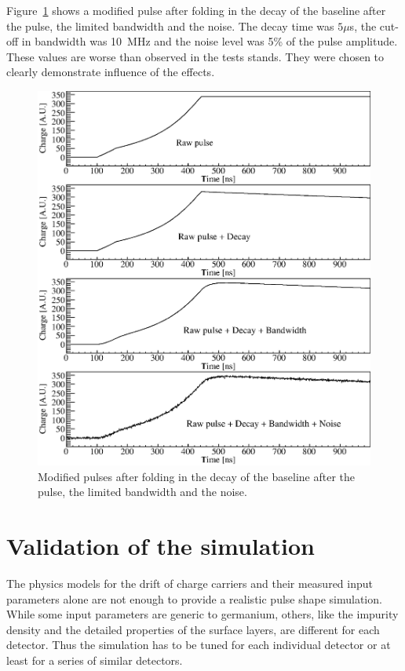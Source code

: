 \documentclass[epj]{svjour}
\begin{document}
Figure~\ref{f:elec} shows a modified pulse after folding in the decay
of the baseline after the pulse, the limited bandwidth and the
noise. The decay time was $5 \mu$s, the cut-off in bandwidth was
10~MHz and the noise level was 5\% of the pulse amplitude. These
values are worse than observed in the tests stands. They were chosen
to clearly demonstrate influence of the effects.
\begin{figure}
\includegraphics[width=\linewidth]{PSDBN} 
\caption{Modified pulses after folding in the decay of the baseline
after the pulse, the limited bandwidth and the noise.}
\label{f:elec} 
\end{figure}

\section{Validation of the simulation}
\label{s:psv}

The physics models \cite{miha, bart} for the drift of charge carriers
and their measured input parameters \cite{miha, bart} alone are not
enough to provide a realistic pulse shape simulation. While some input
parameters are generic to germanium, others, like the impurity density
and the detailed properties of the surface layers, are different for
each detector. Thus the simulation has to be tuned for each individual
detector or at least for a series of similar detectors.
\end{document}

